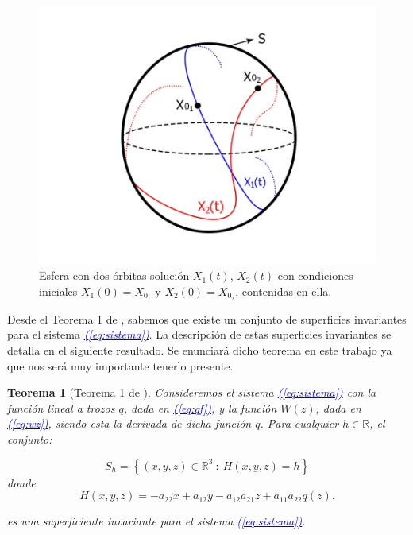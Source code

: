 \documentclass[12pt,a4paper]{report} %
\newtheorem{theorem}{Teorema}[chapter]
\newcommand{\eref}[1]{\hyperref[#1]{\textcolor{blue}{\textit{(\ref*{#1})}}}}
\begin{document}
	\begin{figure}[h]
		\centering
		\includegraphics[width=1\textwidth]{esfera.jpg}
		\caption{Esfera con dos órbitas solución $X_1(t)$, $X_2(t)$ con condiciones iniciales $X_1(0)=X_{0_1}$ y $X_2(0)=X_{0_2}$, contenidas en ella.}
		\label{fig:esfera}
	\end{figure}\smallskip
	\newpage
	
	Desde el Teorema 1 de \cite{ponce}, sabemos que existe un conjunto de superficies invariantes para el sistema \eref{eq:sistema}. La descripción de estas superficies invariantes se detalla en el siguiente resultado. Se enunciará dicho teorema en este trabajo ya que nos será muy importante tenerlo presente.

	\begin{theorem}[Teorema 1 de \cite{ponce}]
		\label{teorema1}
		Consideremos el sistema \eref{eq:sistema} con la función lineal a trozos $q$, dada en \eref{eq:qf}, y la función $W(z)$, dada en \eref{eq:wz}, siendo esta la derivada de dicha función $q$. Para cualquier $h \in \mathbb{R}$, el conjunto:
		
		\begin{equation}
			\label{eq:sh}
			S_h=\left\{(x,y,z)\in \mathbb{R}^3\: : \: H(x,y,z)=h \right\}
		\end{equation}
		donde
		\begin{equation}
			\label{eq:hecuation}
			H(x,y,z)=-a_{22}x+a_{12}y-a_{12}a_{21}z+a_{11}a_{22}q(z).
		\end{equation}\smallskip
		
		\noindent es una superficiente invariante para el sistema \eref{eq:sistema}.
	\end{theorem}
		
\end{document}
